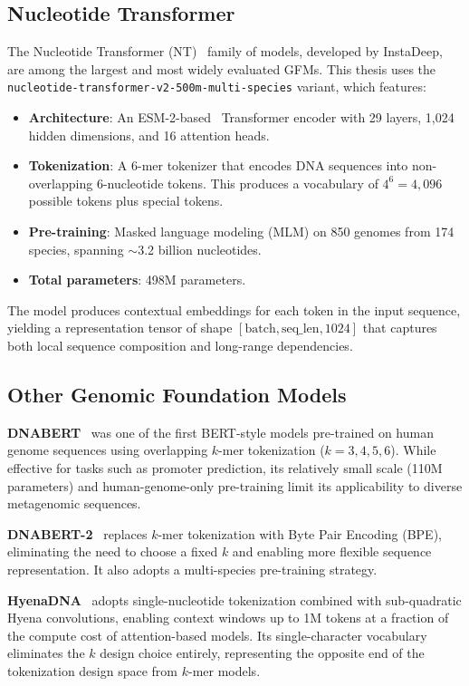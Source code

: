 \subsection{Nucleotide Transformer}

The Nucleotide Transformer (NT)~\cite{DallaTorre2023} family of models, developed by InstaDeep, are among the largest and most widely evaluated GFMs. This thesis uses the \texttt{nucleotide-transformer-v2-500m-multi-species} variant, which features:

\begin{itemize}
    \item \textbf{Architecture}: An ESM-2-based~\cite{Lin2023} Transformer encoder with 29 layers, 1,024 hidden dimensions, and 16 attention heads.
    \item \textbf{Tokenization}: A 6-mer tokenizer that encodes DNA sequences into non-overlapping 6-nucleotide tokens. This produces a vocabulary of $4^6 = 4,096$ possible tokens plus special tokens.
    \item \textbf{Pre-training}: Masked language modeling (MLM) on 850 genomes from 174 species, spanning $\sim$3.2 billion nucleotides.
    \item \textbf{Total parameters}: 498M parameters.
\end{itemize}

The model produces contextual embeddings for each token in the input sequence, yielding a representation tensor of shape $[\text{batch}, \text{seq\_len}, 1024]$ that captures both local sequence composition and long-range dependencies.

\subsection{Other Genomic Foundation Models}

\textbf{DNABERT}~\cite{Ji2021} was one of the first BERT-style models pre-trained on human genome sequences using overlapping $k$-mer tokenization ($k=3,4,5,6$). While effective for tasks such as promoter prediction, its relatively small scale (110M parameters) and human-genome-only pre-training limit its applicability to diverse metagenomic sequences.

\textbf{DNABERT-2}~\cite{Zhou2024dnabert2} replaces $k$-mer tokenization with Byte Pair Encoding (BPE), eliminating the need to choose a fixed $k$ and enabling more flexible sequence representation. It also adopts a multi-species pre-training strategy.

\textbf{HyenaDNA}~\cite{Nguyen2023hyena} adopts single-nucleotide tokenization combined with sub-quadratic Hyena convolutions, enabling context windows up to 1M tokens at a fraction of the compute cost of attention-based models. Its single-character vocabulary eliminates the $k$ design choice entirely, representing the opposite end of the tokenization design space from $k$-mer models.

